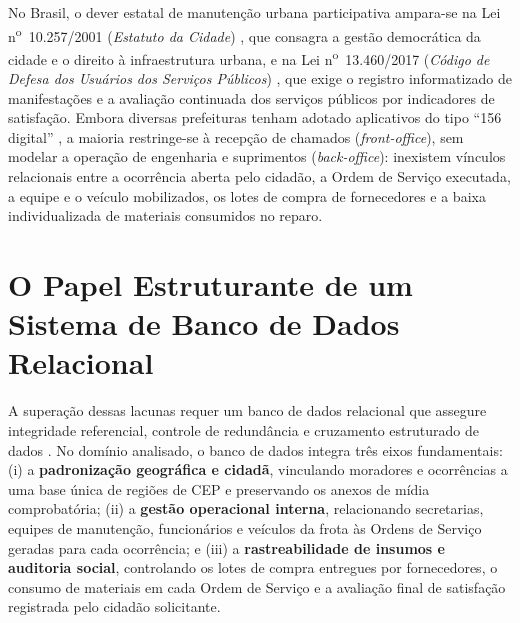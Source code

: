 No Brasil, o dever estatal de manutenção urbana participativa ampara-se na Lei n\textsuperscript{o}~10.257/2001 (\emph{Estatuto da Cidade}) \cite{brasil2001estatutocidade}, que consagra a gestão democrática da cidade e o direito à infraestrutura urbana, e na Lei n\textsuperscript{o}~13.460/2017 (\emph{Código de Defesa dos Usuários dos Serviços Públicos}) \cite{brasil2017lei13460}, que exige o registro informatizado de manifestações e a avaliação continuada dos serviços públicos por indicadores de satisfação. Embora diversas prefeituras tenham adotado aplicativos do tipo ``156 digital'' \cite{ibge2024munic}, a maioria restringe-se à recepção de chamados (\emph{front-office}), sem modelar a operação de engenharia e suprimentos (\emph{back-office}): inexistem vínculos relacionais entre a ocorrência aberta pelo cidadão, a Ordem de Serviço executada, a equipe e o veículo mobilizados, os lotes de compra de fornecedores e a baixa individualizada de materiais consumidos no reparo.

\section{O Papel Estruturante de um Sistema de Banco de Dados Relacional}
\label{sec:papel-banco-dados}

A superação dessas lacunas requer um banco de dados relacional que assegure integridade referencial, controle de redundância e cruzamento estruturado de dados \cite{elmasri2019sistemas}. No domínio analisado, o banco de dados integra três eixos fundamentais: (i) a \textbf{padronização geográfica e cidadã}, vinculando moradores e ocorrências a uma base única de regiões de CEP e preservando os anexos de mídia comprobatória; (ii) a \textbf{gestão operacional interna}, relacionando secretarias, equipes de manutenção, funcionários e veículos da frota às Ordens de Serviço geradas para cada ocorrência; e (iii) a \textbf{rastreabilidade de insumos e auditoria social}, controlando os lotes de compra entregues por fornecedores, o consumo de materiais em cada Ordem de Serviço e a avaliação final de satisfação registrada pelo cidadão solicitante.
